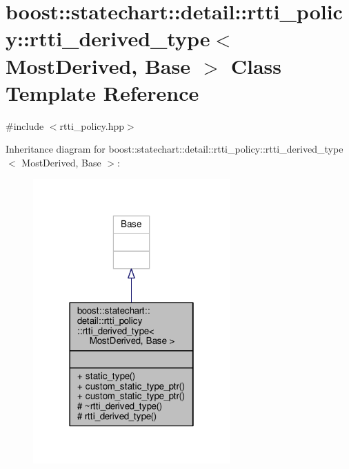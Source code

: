 \hypertarget{classboost_1_1statechart_1_1detail_1_1rtti__policy_1_1rtti__derived__type}{}\section{boost\+:\+:statechart\+:\+:detail\+:\+:rtti\+\_\+policy\+:\+:rtti\+\_\+derived\+\_\+type$<$ Most\+Derived, Base $>$ Class Template Reference}
\label{classboost_1_1statechart_1_1detail_1_1rtti__policy_1_1rtti__derived__type}


{\ttfamily \#include $<$rtti\+\_\+policy.\+hpp$>$}



Inheritance diagram for boost\+:\+:statechart\+:\+:detail\+:\+:rtti\+\_\+policy\+:\+:rtti\+\_\+derived\+\_\+type$<$ Most\+Derived, Base $>$\+:
\nopagebreak
\begin{figure}[H]
\begin{center}
\leavevmode
\includegraphics[width=214pt]{classboost_1_1statechart_1_1detail_1_1rtti__policy_1_1rtti__derived__type__inherit__graph}
\end{center}
\end{figure}


